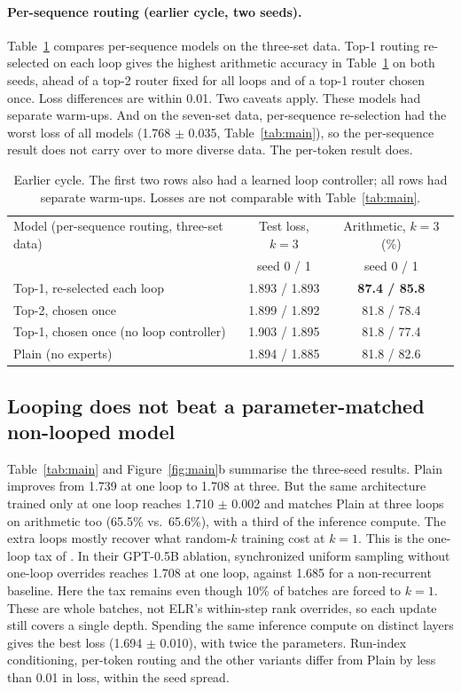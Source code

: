 \documentclass[11pt]{article}
\begin{document}
\paragraph{Per-sequence routing (earlier cycle, two seeds).} Table~\ref{tab:seq} compares per-sequence models on the three-set data. Top-1 routing re-selected on each loop gives the highest arithmetic accuracy in Table~\ref{tab:seq} on both seeds, ahead of a top-2 router fixed for all loops and of a top-1 router chosen once. Loss differences are within 0.01. Two caveats apply. These models had separate warm-ups. And on the seven-set data, per-sequence re-selection had the worst loss of all models (1.768 $\pm$ 0.035, Table~\ref{tab:main}), so the per-sequence result does not carry over to more diverse data. The per-token result does.

\begin{table}[t]
\centering\small
\begin{tabular}{lcc}
\toprule
Model (per-sequence routing, three-set data) & Test loss, $k{=}3$ & Arithmetic, $k{=}3$ (\%) \\
& seed 0 / 1 & seed 0 / 1 \\
\midrule
Top-1, re-selected each loop & 1.893 / 1.893 & \textbf{87.4 / 85.8} \\
Top-2, chosen once & 1.899 / 1.892 & 81.8 / 78.4 \\
Top-1, chosen once (no loop controller) & 1.903 / 1.895 & 81.8 / 77.4 \\
Plain (no experts) & 1.894 / 1.885 & 81.8 / 82.6 \\
\bottomrule
\end{tabular}
\caption{Earlier cycle. The first two rows also had a learned loop controller; all rows had separate warm-ups. Losses are not comparable with Table~\ref{tab:main}.}
\label{tab:seq}
\end{table}

\subsection{Looping does not beat a parameter-matched non-looped model}
Table~\ref{tab:main} and Figure~\ref{fig:main}b summarise the three-seed results. Plain improves from 1.739 at one loop to 1.708 at three. But the same architecture trained only at one loop reaches 1.710 $\pm$ 0.002 and matches Plain at three loops on arithmetic too (65.5\% vs.\ 65.6\%), with a third of the inference compute. The extra loops mostly recover what random-$k$ training cost at $k{=}1$. This is the one-loop tax of \cite{elr}. In their GPT-0.5B ablation, synchronized uniform sampling without one-loop overrides reaches 1.708 at one loop, against 1.685 for a non-recurrent baseline. Here the tax remains even though 10\% of batches are forced to $k{=}1$. These are whole batches, not ELR's within-step rank overrides, so each update still covers a single depth. Spending the same inference compute on distinct layers gives the best loss (1.694 $\pm$ 0.010), with twice the parameters. Run-index conditioning, per-token routing and the other variants differ from Plain by less than 0.01 in loss, within the seed spread.
\end{document}
